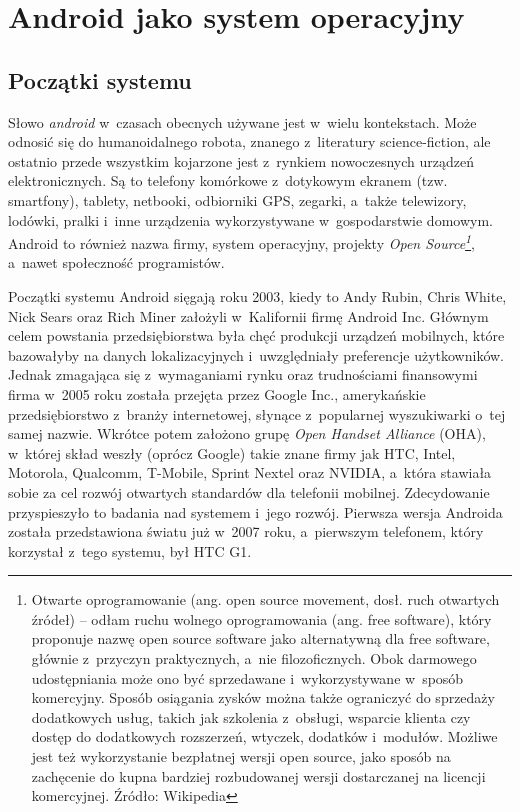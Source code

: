 \chapter{Android jako system operacyjny}

\section{Początki systemu}
Słowo \textit{android} w~czasach obecnych używane jest w~wielu kontekstach. Może odnosić się do humanoidalnego robota, znanego z~literatury science-fiction, ale ostatnio przede wszystkim kojarzone jest z~rynkiem nowoczesnych urządzeń elektronicznych. Są to telefony komórkowe z~dotykowym ekranem (tzw. smartfony), tablety, netbooki, odbiorniki GPS, zegarki, a~także telewizory, lodówki, pralki i~inne urządzenia wykorzystywane w~gospodarstwie domowym. Android to również nazwa firmy, system operacyjny, projekty \textit{Open Source\footnote{Otwarte oprogramowanie (ang. open source movement, dosł. ruch otwartych źródeł) – odłam ruchu wolnego oprogramowania (ang. free software), który proponuje nazwę open source software jako alternatywną dla free software, głównie z~przyczyn praktycznych, a~nie filozoficznych. Obok darmowego udostępniania może ono być sprzedawane i~wykorzystywane w~sposób komercyjny. Sposób osiągania zysków można także ograniczyć do sprzedaży dodatkowych usług, takich jak szkolenia z~obsługi, wsparcie klienta czy dostęp do dodatkowych rozszerzeń, wtyczek, dodatków i~modułów. Możliwe jest też wykorzystanie bezpłatnej wersji open source, jako sposób na zachęcenie do kupna bardziej rozbudowanej wersji dostarczanej na licencji komercyjnej. Źródło: Wikipedia}}, a~nawet społeczność programistów.

Początki systemu Android sięgają roku 2003, kiedy to Andy Rubin, Chris White, Nick Sears oraz Rich Miner założyli w~Kalifornii firmę Android Inc. Głównym celem powstania przedsiębiorstwa była chęć produkcji urządzeń mobilnych, które bazowałyby na danych lokalizacyjnych i~uwzględniały preferencje użytkowników. Jednak zmagająca się z~wymaganiami rynku oraz trudnościami finansowymi firma w~2005 roku została przejęta przez Google Inc., amerykańskie przedsiębiorstwo z~branży internetowej, słynące z~popularnej wyszukiwarki o~tej samej nazwie. Wkrótce potem założono grupę \textit{Open Handset Alliance} (OHA), w~której skład weszły (oprócz Google) takie znane firmy jak HTC, Intel, Motorola, Qualcomm, T-Mobile, Sprint Nextel oraz NVIDIA, a~która stawiała sobie za cel rozwój otwartych standardów dla telefonii mobilnej. Zdecydowanie przyspieszyło to badania nad systemem i~jego rozwój. Pierwsza wersja Androida została przedstawiona światu już w~2007 roku, a~pierwszym telefonem, który korzystał z~tego systemu, był HTC G1.

